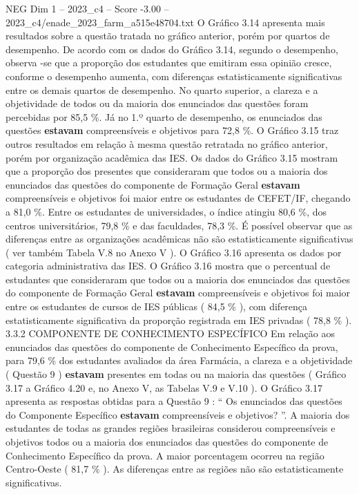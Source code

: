 \begin{textsample}{NEG Dim 1 – 2023\_c4 – Score -3.00 – 2023\_c4/enade\_2023\_farm\_a515e48704.txt}
O Gráfico 3.14 apresenta mais resultados sobre a questão tratada no gráfico anterior, porém por quartos de desempenho.
De acordo com os dados do Gráfico 3.14, segundo o desempenho, observa -se que a proporção dos estudantes que emitiram essa opinião cresce, conforme o desempenho aumenta, com diferenças estatisticamente significativas entre os demais quartos de desempenho.
No quarto superior, a clareza e a objetividade de todos ou da maioria dos enunciados das questões foram percebidas por 85,5 \%.
Já no 1.º quarto de desempenho, os enunciados das questões \textbf{estavam} compreensíveis e objetivos para 72,8 \%.
O Gráfico 3.15 traz outros resultados em relação à mesma questão retratada no gráfico anterior, porém por organização acadêmica das IES.
Os dados do Gráfico 3.15 mostram que a proporção dos presentes que consideraram que todos ou a maioria dos enunciados das questões do componente de Formação Geral \textbf{estavam} compreensíveis e objetivos foi maior entre os estudantes de CEFET/IF, chegando a 81,0 \%.
Entre os estudantes de universidades, o índice atingiu 80,6 \%, dos centros universitários, 79,8 \% e das faculdades, 78,3 \%.
É possível observar que as diferenças entre as organizações acadêmicas não são estatisticamente significativas ( ver também Tabela V.8 no Anexo V ).
O Gráfico 3.16 apresenta os dados por categoria administrativa das IES.
O Gráfico 3.16 mostra que o percentual de estudantes que consideraram que todos ou a maioria dos enunciados das questões do componente de Formação Geral \textbf{estavam} compreensíveis e objetivos foi maior entre os estudantes de cursos de IES públicas ( 84,5 \% ), com diferença estatisticamente significativa da proporção registrada em IES privadas ( 78,8 \% ). 3.3.2 COMPONENTE DE CONHECIMENTO ESPECÍFICO Em relação aos enunciados das questões do componente de Conhecimento Específico da prova, para 79,6 \% dos estudantes avaliados da área Farmácia, a clareza e a objetividade ( Questão 9 ) \textbf{estavam} presentes em todas ou na maioria das questões ( Gráfico 3.17 a Gráfico 4.20 e, no Anexo V, as Tabelas V.9 e V.10 ).
O Gráfico 3.17 apresenta as respostas obtidas para a Questão 9 : “ Os enunciados das questões do Componente Específico \textbf{estavam} compreensíveis e objetivos? ”.
A maioria dos estudantes de todas as grandes regiões brasileiras considerou compreensíveis e objetivos todos ou a maioria dos enunciados das questões do componente de Conhecimento Específico da prova.
A maior porcentagem ocorreu na região Centro-Oeste ( 81,7 \% ).
As diferenças entre as regiões não são estatisticamente significativas.

\end{textsample}
